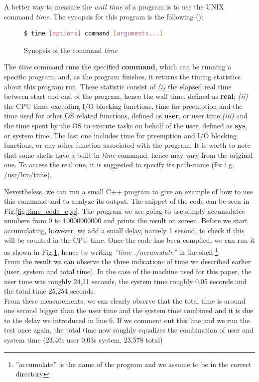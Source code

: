 A better way to measure the \textit{wall time} of a program is to use the UNIX command \textit{time}. The synopsis for this program is the following (\cite{linux_commands}):\\
\begin{figure}[h]
\begin{lstlisting}[language=bash]
   $ time [options] command [arguments...]
\end{lstlisting}
\caption{Synopsis of the command \textit{time}}
\label{fig:time_code}
\end{figure}


The \textit{time} command runs the specified \textbf{command}, which can be running a specific program, and, as the program finishes, it returns the timing statistics about this program run.
These statistic consist of \textit{(i)} the elapsed real time between start and end of the program, hence the wall time, defined as \textbf{real}; \textit{(ii)} the CPU time, excluding I/O blocking functions, time for preemption and the time used for other OS related functions, defined as \textbf{user}, or user time;\textit{(iii)} and the time spent by the OS to execute tasks on behalf of the user, defined as \textbf{sys}, or system time. The last one includes time for preemption and I/O blocking functions, or any other function associated with the program. \cite{Stewart2001MeasuringET}
It is worth to note that some shells have a built-in \textit{time} command, hence may vary from the original one. To access the real one, it is suggested to specify its path-name (for i.g. /usr/bin/time). \cite{linux_commands} 

Nevertheless, we can run a small C++ program to give an example of how to use this command and to analyze its output. The snippet of the code can be seen in Fig.\ref{fig:time_code_cpp}. The program we are going to use simply accumulates numbers from 0  to 10000000000 and prints the result on screen. Before we start accumulating, however, we add a small delay, namely 1 second, to check if this will be counted in the CPU time. Once the code has been compiled, we can run it as shown in Fig.\ref{fig:time_code}, hence by writing \textit{''time ./accumulate''} in the shell \footnote{''accumulate'' is the name of the program and we assume to be in the correct directory}.\\
From the result we can observe the three indications of time we described earlier (user, system and total time).  In the case of the machine used for this paper, the user time was roughly 24,11 seconds, the system time roughly 0,05 seconds and the total time 25,254 seconds. \\
From these measurements, we can clearly observe that the total time is around one second bigger than the user time and the system time combined and it is due to the delay we introduced in line 6. If we comment out this line and we run the test once again, the total time now roughly equalizes the combination of user and system time (23,46s user 0,03s system, 23,578 total)



